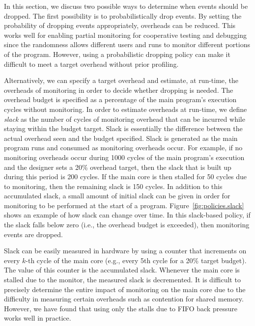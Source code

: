 In this section, we discuss two possible ways to determine when events should
be dropped.  The first possibility is to probabilistically drop events. By
setting the probability of dropping events appropriately, overheads can be
reduced. This works well for enabling partial monitoring for cooperative
testing and debugging since the randomness allows different users and runs to
monitor different portions of the program. However, using a probabilistic
dropping policy can make it difficult to meet a target overhead without prior
profiling.

Alternatively, we can specify a target overhead and estimate, at run-time, the
overheads of monitoring in order to decide whether dropping is needed.  The
overhead budget is specified as a percentage of the main program's execution
cycles without monitoring. In order to estimate overheads at run-time, we
define \emph{slack} as the number of cycles of monitoring overhead that can be
incurred while staying within the budget target. Slack is essentially the
difference between the actual overhead seen and the budget specified. Slack is
generated as the main program runs and consumed as monitoring overheads occur.
For example, if no monitoring overheads occur during 1000 cycles of the main
program's execution and the designer sets a 20\% overhead target, then the
slack that is built up during this period is 200 cycles. If the main core is
then stalled for 50 cycles due to monitoring, then the remaining slack is 150
cycles.  In addition to this accumulated slack, a small amount of initial slack
can be given in order for monitoring to be performed at the start of a program.
Figure~\ref{fig:policies.slack} shows an example of how slack can change over
time.  In this slack-based policy, if the slack falls below zero (i.e., the
overhead budget is exceeded), then monitoring events are dropped.


Slack can be easily measured in hardware by using a counter that increments on
every $k$-th cycle of the main core (e.g., every 5th cycle for a 20\% target
budget). 
The value of this counter is the accumulated slack. Whenever the main core is
stalled due to the monitor, the measured slack is decremented. It is difficult
to precisely determine the entire impact of monitoring on the main core due to
the difficulty in measuring certain overheads such as contention for shared
memory.  However, we have found that using only the stalls due to FIFO back
pressure works well in practice.

